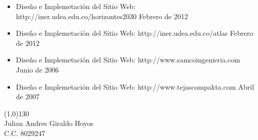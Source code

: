 \documentclass[a4paper, oneside, final, letter]{scrartcl}
\begin{document}
\begin{center}
\begin{itemize}
\item Diseño e Implemetaci\'on del Sitio Web: http://iner.udea.edu.co/horizontes2030
Febrero de 2012

\item Diseño e Implemetaci\'on del Sitio Web: http://iner.udea.edu.co/atlas
Febrero de 2012

\item Diseño e Implemetaci\'on del Sitio Web: http://www.samcoingenieria.com
Junio de 2006

\item Diseño e Implemetaci\'on del Sitio Web: http://www.tejascompakta.com
Abril de 2007
\end{itemize}
\end{center}

\vspace{200pt}
\line(1,0){130}\\
\large Julian Andres Giraldo Hoyos\\
\large C.C. 8029247
\end{document}
